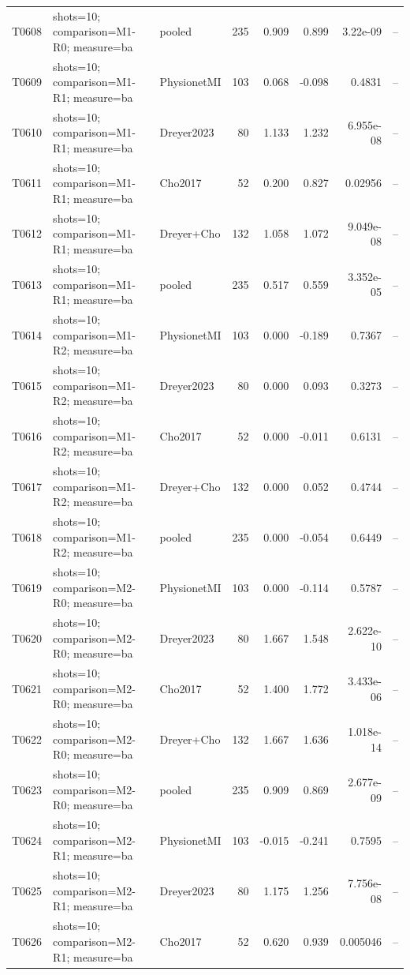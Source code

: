 \begin{longtable}{p{.45in}p{2.6in}p{.75in}rrrrr}
T0608 & shots=10; comparison=M1-R0; measure=ba & pooled & 235 & 0.909 & 0.899 & 3.22e-09 & -- \\
T0609 & shots=10; comparison=M1-R1; measure=ba & PhysionetMI & 103 & 0.068 & -0.098 & 0.4831 & -- \\
T0610 & shots=10; comparison=M1-R1; measure=ba & Dreyer2023 & 80 & 1.133 & 1.232 & 6.955e-08 & -- \\
T0611 & shots=10; comparison=M1-R1; measure=ba & Cho2017 & 52 & 0.200 & 0.827 & 0.02956 & -- \\
T0612 & shots=10; comparison=M1-R1; measure=ba & Dreyer+Cho & 132 & 1.058 & 1.072 & 9.049e-08 & -- \\
T0613 & shots=10; comparison=M1-R1; measure=ba & pooled & 235 & 0.517 & 0.559 & 3.352e-05 & -- \\
T0614 & shots=10; comparison=M1-R2; measure=ba & PhysionetMI & 103 & 0.000 & -0.189 & 0.7367 & -- \\
T0615 & shots=10; comparison=M1-R2; measure=ba & Dreyer2023 & 80 & 0.000 & 0.093 & 0.3273 & -- \\
T0616 & shots=10; comparison=M1-R2; measure=ba & Cho2017 & 52 & 0.000 & -0.011 & 0.6131 & -- \\
T0617 & shots=10; comparison=M1-R2; measure=ba & Dreyer+Cho & 132 & 0.000 & 0.052 & 0.4744 & -- \\
T0618 & shots=10; comparison=M1-R2; measure=ba & pooled & 235 & 0.000 & -0.054 & 0.6449 & -- \\
T0619 & shots=10; comparison=M2-R0; measure=ba & PhysionetMI & 103 & 0.000 & -0.114 & 0.5787 & -- \\
T0620 & shots=10; comparison=M2-R0; measure=ba & Dreyer2023 & 80 & 1.667 & 1.548 & 2.622e-10 & -- \\
T0621 & shots=10; comparison=M2-R0; measure=ba & Cho2017 & 52 & 1.400 & 1.772 & 3.433e-06 & -- \\
T0622 & shots=10; comparison=M2-R0; measure=ba & Dreyer+Cho & 132 & 1.667 & 1.636 & 1.018e-14 & -- \\
T0623 & shots=10; comparison=M2-R0; measure=ba & pooled & 235 & 0.909 & 0.869 & 2.677e-09 & -- \\
T0624 & shots=10; comparison=M2-R1; measure=ba & PhysionetMI & 103 & -0.015 & -0.241 & 0.7595 & -- \\
T0625 & shots=10; comparison=M2-R1; measure=ba & Dreyer2023 & 80 & 1.175 & 1.256 & 7.756e-08 & -- \\
T0626 & shots=10; comparison=M2-R1; measure=ba & Cho2017 & 52 & 0.620 & 0.939 & 0.005046 & -- \\

\end{longtable}
